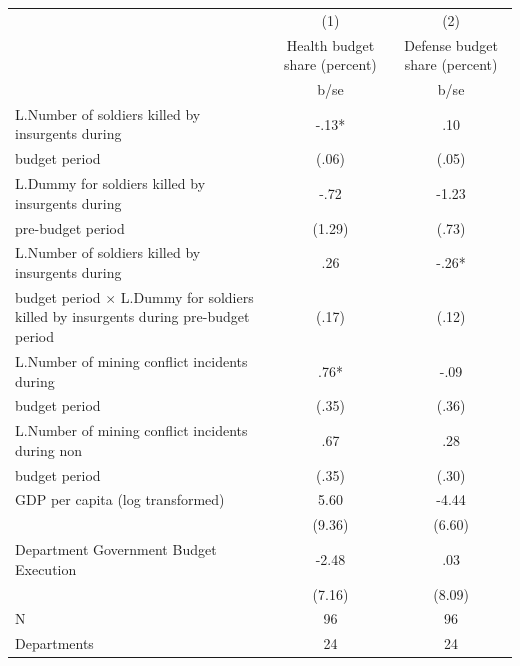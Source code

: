 {
\def\sym#1{\ifmmode^{#1}\else\(^{#1}\)\fi}
\begin{tabular}{l*{2}{c}}
\hline\hline
                                                  &\multicolumn{1}{c}{(1)}&\multicolumn{1}{c}{(2)}\\
                                                  &\multicolumn{1}{c}{Health budget share (percent)}&\multicolumn{1}{c}{Defense budget share (percent)}\\
                                                  &        b/se   &        b/se   \\
\hline
L.Number of soldiers killed by insurgents during  &        -.13*  &         .10   \\
budget period                                     &       (.06)   &       (.05)   \\
L.Dummy for soldiers killed by insurgents during  &        -.72   &       -1.23   \\
pre-budget period                                 &      (1.29)   &       (.73)   \\
L.Number of soldiers killed by insurgents during  &         .26   &        -.26*  \\
budget period $\times$ L.Dummy for soldiers killed by insurgents during pre-budget period&       (.17)   &       (.12)   \\
L.Number of mining conflict incidents during      &         .76*  &        -.09   \\
budget period                                     &       (.35)   &       (.36)   \\
L.Number of mining conflict incidents during non  &         .67   &         .28   \\
budget period                                     &       (.35)   &       (.30)   \\
GDP per capita (log transformed)                  &        5.60   &       -4.44   \\
                                                  &      (9.36)   &      (6.60)   \\
Department Government Budget Execution            &       -2.48   &         .03   \\
                                                  &      (7.16)   &      (8.09)   \\
\hline
N                                                 &          96   &          96   \\
Departments                                       &          24   &          24   \\
\hline\hline
\end{tabular}
}
